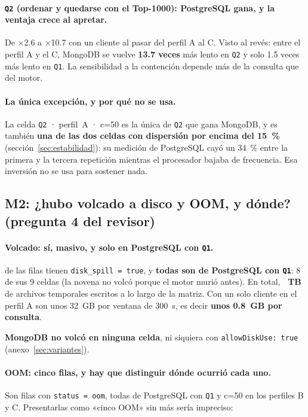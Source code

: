 \paragraph{\texttt{Q2} (ordenar y quedarse con el Top-1000): PostgreSQL gana, y la ventaja crece al apretar.}
De $\times$2.6 a $\times$10.7 con un cliente al pasar del perfil A al C. Visto al
revés: entre el perfil A y el C, MongoDB se vuelve \textbf{13.7 veces} más lento
en \texttt{Q2} y solo 1.5 veces más lento en \texttt{Q1}. La sensibilidad a la
contención depende más de la consulta que del motor.

\paragraph{La única excepción, y por qué no se usa.}
La celda \texttt{Q2} · perfil~A · \mbox{c=50} es la única de \texttt{Q2} que gana
MongoDB, y es también \textbf{una de las dos celdas con dispersión por encima del
15~\%} (sección~\ref{sec:estabilidad}): su medición de PostgreSQL cayó un 34~\%
entre la primera y la tercera repetición mientras el procesador bajaba de
frecuencia. Esa inversión no se usa para sostener nada.

\subsection{M2: ¿hubo volcado a disco y OOM, y dónde? (pregunta 4 del revisor)}
\label{sec:spill}

\paragraph{Volcado: sí, masivo, y solo en PostgreSQL con \texttt{Q1}.}
\cifraFilasConSpill{} de las \cifraFilasCsv{} filas tienen
\texttt{disk\_spill = true}, y \textbf{todas son de PostgreSQL con \texttt{Q1}}:
8 de sus 9 celdas (la novena no volcó porque el motor murió antes). En total,
\textbf{\cifraTempTotalTB{}~TB} de archivos temporales escritos a lo largo de la
matriz. Con un solo cliente en el perfil A son unos 32~GB por ventana de 300~s,
es decir \textbf{unos 0.8~GB por consulta}.

\textbf{MongoDB no volcó en ninguna celda}, ni siquiera con
\texttt{allowDiskUse: true} (anexo~\ref{sec:variantes}).

\paragraph{OOM: cinco filas, y hay que distinguir dónde ocurrió cada uno.}
Son \cifraFilasOom{} filas con \texttt{status = oom}, todas de PostgreSQL con
\texttt{Q1} y \mbox{c=50} en los perfiles B y C. Presentarlas como «cinco OOM» sin
más sería impreciso:

